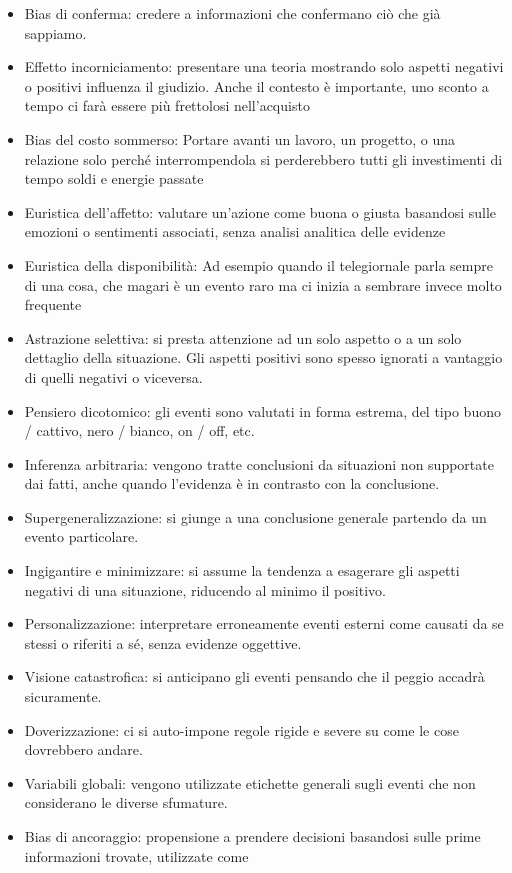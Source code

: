\documentclass[12pt]{book} %
\begin{document}
\begin{itemize}
\item Bias di conferma: credere a informazioni che confermano ciò che già sappiamo.
\item Effetto incorniciamento: presentare una teoria mostrando solo aspetti negativi o positivi influenza il giudizio.
Anche il contesto è importante, uno sconto a tempo ci farà essere più frettolosi nell'acquisto 
\item Bias del costo sommerso: Portare avanti un lavoro, un progetto, o una relazione solo perché interrompendola si
perderebbero tutti gli investimenti di tempo soldi e energie passate
\item Euristica dell'affetto: valutare un’azione come buona o giusta basandosi sulle emozioni o sentimenti associati, senza analisi analitica delle evidenze
\item Euristica della disponibilità: Ad esempio quando il telegiornale parla sempre di una cosa, che magari è un evento
raro ma ci inizia a sembrare invece molto frequente 
\item Astrazione selettiva: si presta attenzione ad un solo aspetto o a un solo dettaglio della situazione. Gli aspetti
positivi sono spesso ignorati a vantaggio di quelli negativi o viceversa.
\item Pensiero dicotomico: gli eventi sono valutati in forma estrema, del tipo buono / cattivo, nero / bianco, on / off,
etc.
\item Inferenza arbitraria: vengono tratte conclusioni da situazioni non supportate dai fatti, anche quando
l'evidenza è in contrasto con la conclusione.
\item Supergeneralizzazione: si giunge a una conclusione generale partendo da un evento particolare.
\item Ingigantire e minimizzare: si assume la tendenza a esagerare gli aspetti negativi di una situazione, riducendo al
minimo il positivo.
\item Personalizzazione: interpretare erroneamente eventi esterni come causati da se stessi o riferiti a sé, senza evidenze oggettive.
\item Visione catastrofica: si anticipano gli eventi pensando che il peggio accadrà sicuramente.
\item Doverizzazione: ci si auto-impone regole rigide e severe su come le cose dovrebbero andare.
\item Variabili globali: vengono utilizzate etichette generali sugli eventi che non considerano le diverse sfumature.
\item Bias di ancoraggio: propensione a prendere decisioni basandosi sulle prime informazioni trovate, utilizzate come

\end{itemize}
\end{document}
